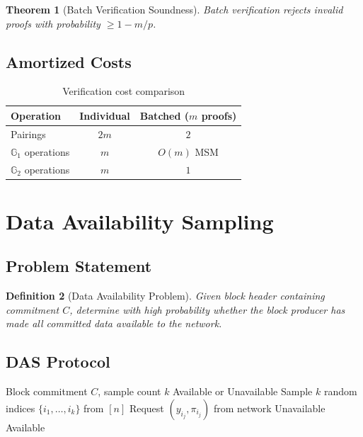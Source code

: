\documentclass[11pt,a4paper]{article}
\newtheorem{theorem}{Theorem}[section]
\newtheorem{definition}[theorem]{Definition}
\newcommand{\G}{\mathbb{G}}
\begin{document}
\begin{theorem}[Batch Verification Soundness]
Batch verification rejects invalid proofs with probability $\geq 1 - m/p$.
\end{theorem}

\subsection{Amortized Costs}

\begin{table}[h]
\centering
\begin{tabular}{lcc}
\toprule
\textbf{Operation} & \textbf{Individual} & \textbf{Batched ($m$ proofs)} \\
\midrule
Pairings & $2m$ & $2$ \\
$\G_1$ operations & $m$ & $O(m)$ MSM \\
$\G_2$ operations & $m$ & $1$ \\
\bottomrule
\end{tabular}
\caption{Verification cost comparison}
\label{tab:batch-cost}
\end{table}

\section{Data Availability Sampling}
\label{sec:das}

\subsection{Problem Statement}

\begin{definition}[Data Availability Problem]
Given block header containing commitment $C$, determine with high probability whether the block producer has made all committed data available to the network.
\end{definition}

\subsection{DAS Protocol}

\begin{algorithm}
\caption{Data Availability Sampling (Light Client)}
\label{alg:das}
\begin{algorithmic}[1]
\Require Block commitment $C$, sample count $k$
\Ensure Available or Unavailable
\State Sample $k$ random indices $\{i_1, \ldots, i_k\}$ from $[n]$
    \State Request $(y_{i_j}, \pi_{i_j})$ from network
        \State \Return Unavailable
    \EndIf
\EndFor
\State \Return Available
\end{algorithmic}
\end{algorithm}
\end{document}
